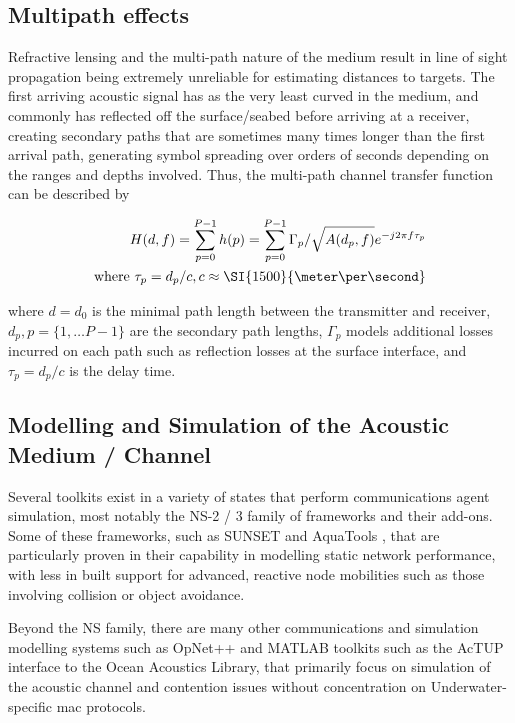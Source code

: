 \subsection{Multipath effects}

Refractive lensing and the multi-path nature of the medium result in line of sight propagation being extremely unreliable for estimating distances to targets.
The first arriving acoustic signal has as the very least curved in the medium, and commonly has reflected off the surface/seabed before arriving at a receiver, creating secondary paths that are sometimes many times longer than the first arrival path, generating symbol spreading over orders of seconds depending on the ranges and depths involved.
Thus, the multi-path channel transfer function can be described by 

\begin{align}
  \label{eq:acomultipath}
  H(d,f) =\sum_{p=0}^{P-1} h(p) = \sum_{p=0}^{P-1} \Gamma_p / \sqrt{A(d_p,f)}e^{-j 2 \pi f \tau_p} \\
  \text{where } \tau_p = d_p/c, c \approx \SI{1500}{\meter\per\second} \notag
\end{align}

where $d=d_0$ is the minimal path length between the transmitter and receiver, $d_p,p=\{1,\dots P-1\}$ are the secondary path lengths, $\Gamma_p$ models additional losses incurred on each path such as reflection losses at the surface interface, and $\tau_p = d_p/c$ is the delay time.




\subsection{Modelling and Simulation of the Acoustic Medium / Channel}

Several toolkits exist in a variety of states that perform communications agent simulation, most notably the NS-2 / 3 family of frameworks and their add-ons.
Some of these frameworks, such as SUNSET \cite{Petrioli2012a} and AquaTools \cite{Sehgal2010}, that are particularly proven in their capability in modelling static network performance, with less in built support for advanced, reactive node mobilities such as those involving collision or object avoidance.

Beyond the NS family, there are many other communications and simulation modelling systems such as OpNet++\cite{Chang1999} and MATLAB toolkits such as the AcTUP interface to the Ocean Acoustics Library, that primarily focus on simulation of the acoustic channel and contention issues without concentration on Underwater-specific \gls{mac} protocols.

